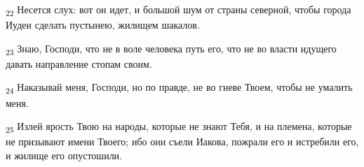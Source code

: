 \begin{tcolorbox}
\textsubscript{22} Несется слух: вот он идет, и большой шум от страны северной, чтобы города Иудеи сделать пустынею, жилищем шакалов.
\end{tcolorbox}
\begin{tcolorbox}
\textsubscript{23} Знаю, Господи, что не в воле человека путь его, что не во власти идущего давать направление стопам своим.
\end{tcolorbox}
\begin{tcolorbox}
\textsubscript{24} Наказывай меня, Господи, но по правде, не во гневе Твоем, чтобы не умалить меня.
\end{tcolorbox}
\begin{tcolorbox}
\textsubscript{25} Излей ярость Твою на народы, которые не знают Тебя, и на племена, которые не призывают имени Твоего; ибо они съели Иакова, пожрали его и истребили его, и жилище его опустошили.
\end{tcolorbox}
